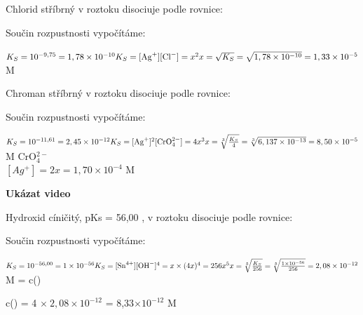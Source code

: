 
Chlorid stříbrný v roztoku disociuje podle rovnice:


Součin rozpustnosti vypočítáme:

$K_S = 10^{-9,75} = 1,78\times 10^{-10}\\
K_S = [\ce{Ag+}][\ce{Cl-}] = x^2\\
x = \sqrt{K_S} = \sqrt{1,78\times 10^{-10}} = 1,33\times 10^{-5}$ M



Chroman stříbrný v roztoku disociuje podle rovnice:


Součin rozpustnosti vypočítáme:

$K_S = 10^{-11,61} = 2,45\times 10^{-12}\\
K_S = [\ce{Ag+}]^2[\ce{CrO$^{2-}_4$}] = 4x^3\\
x = \sqrt[3]{\frac{K_S}{4}} = \sqrt[3]{6,137\times 10^{-13}} = 8,50\times 10^{-5}$ M CrO$^{2-}_4$\\
$[Ag^+] = 2x = 1,70\times10^{-4}$ M

\textbf{Ukázat video}\footnotemark {}


\clearpage


Hydroxid cíničitý, pKs = 56,00 , v roztoku disociuje podle rovnice:


Součin rozpustnosti vypočítáme:

$K_S = 10^{-56,00} = 1 \times 10^{-56}\\
K_S = [\ce{Sn^{4+}}][\ce{OH-}]^4 = x \times (4x)^4 = 256x^5\\
x = \sqrt[5]{\frac{K_S}{256}} = \sqrt[5]{\frac{1 \times 10^{-56}}{256}} = 2,08\times 10^{-12}$ M = c()

c() = 4 $\times\ 2,08\times10^{-12}$ = 8,33$\times10^{-12}$ M


\clearpage